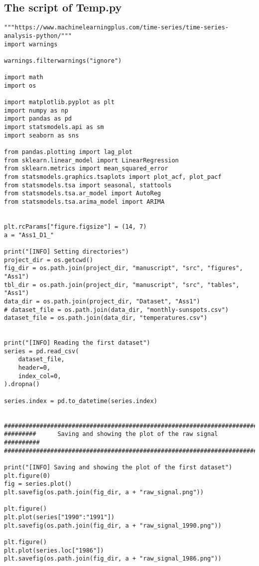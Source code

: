 \documentclass[12pt]{article}
\begin{document}
\subsection*{The script of Temp.py}
\begin{lstlisting}
"""https://www.machinelearningplus.com/time-series/time-series-analysis-python/"""
import warnings

warnings.filterwarnings("ignore")

import math
import os

import matplotlib.pyplot as plt
import numpy as np
import pandas as pd
import statsmodels.api as sm
import seaborn as sns

from pandas.plotting import lag_plot
from sklearn.linear_model import LinearRegression
from sklearn.metrics import mean_squared_error
from statsmodels.graphics.tsaplots import plot_acf, plot_pacf
from statsmodels.tsa import seasonal, stattools
from statsmodels.tsa.ar_model import AutoReg
from statsmodels.tsa.arima_model import ARIMA


plt.rcParams["figure.figsize"] = (14, 7)
a = "Ass1_D1_"

print("[INFO] Setting directories")
project_dir = os.getcwd()
fig_dir = os.path.join(project_dir, "manuscript", "src", "figures", "Ass1")
tbl_dir = os.path.join(project_dir, "manuscript", "src", "tables", "Ass1")
data_dir = os.path.join(project_dir, "Dataset", "Ass1")
# dataset_file = os.path.join(data_dir, "monthly-sunspots.csv")
dataset_file = os.path.join(data_dir, "temperatures.csv")


print("[INFO] Reading the first dataset")
series = pd.read_csv(
    dataset_file,
    header=0,
    index_col=0,
).dropna()

series.index = pd.to_datetime(series.index)


############################################################################
#########      Saving and showing the plot of the raw signal      ##########
############################################################################

print("[INFO] Saving and showing the plot of the first dataset")
plt.figure(0)
fig = series.plot()
plt.savefig(os.path.join(fig_dir, a + "raw_signal.png"))

plt.figure()
plt.plot(series["1990":"1991"])
plt.savefig(os.path.join(fig_dir, a + "raw_signal_1990.png"))

plt.figure()
plt.plot(series.loc["1986"])
plt.savefig(os.path.join(fig_dir, a + "raw_signal_1986.png"))



\end{lstlisting}
\end{document}
